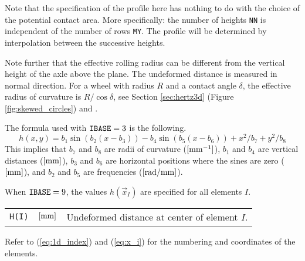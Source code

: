 \documentclass[12pt]{report}
\newenvironment{inputvars}{\vspace{0.4\baselineskip}%

\begin{tabular}{>{\raggedright}p{22mm}p{19mm}p{113mm}}}{
\end{tabular}

}
\newcommand{\inpvar}[3]{{\small\tt #1} & $#2$ & #3 \\[1ex]}
\begin{document}
Note that the specification of the profile here has nothing to do with the
choice of the potential contact area. More specifically: the number of
heights {\tt NN} is independent of the number of rows {\tt MY}. The profile
will be determined by interpolation between the successive heights.

Note further that the effective rolling radius can be different from the
vertical height of the axle above the plane. The undeformed distance is
measured in normal direction. For a wheel with radius $R$ and a contact
angle $\delta$, the effective radius of curvature is $R/\!\cos\delta$,
see Section \ref{sec:hertz3d} (Figure \ref{fig:skewed_circles}) and
\cite[eq.\ (1.61b)]{Kalker1990}.

\label{itm:ibase3}The formula used with ${\tt IBASE}=3$ is the following.
\begin{equation}
 h(x,y) = b_1 \sin( b_2 ( x - b_3 ) ) -  b_4 \sin( b_5 ( x - b_6 ) ) +
        x^2/b_7 + y^2 / b_8
\end{equation}
This implies that $b_7$ and $b_8$ are radii of curvature ($[\mathrm{mm^{-1}}]$),
$b_1$ and $b_4$ are vertical distances ($[\mathrm{mm}]$), $b_3$ and $b_6$ are
horizontal positions where the sines are zero ($[\mathrm{mm}]$), and $b_2$ and $b_5$
are frequencies ($[\mathrm{rad/mm}]$).

\label{itm:ibase9}When ${\tt IBASE}=9$, the values $h(\vec{x}_I)$ are
specified for all elements $I$.
\begin{inputvars}
\inpvar{H(I)}{\bunit{mm}}{Undeformed distance at center of element $I$.}
\end{inputvars}
Refer to (\ref{eq:1d_index}) and (\ref{eq:x_i}) for the numbering and
coordinates of the elements.
\end{document}
